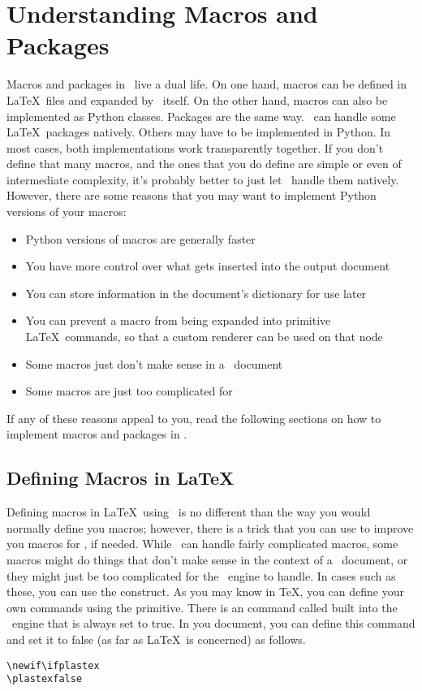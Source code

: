 
\chapter{Understanding Macros and Packages\label{sec:macros}}

Macros and packages in \plasTeX\ live a dual life.  On one hand, macros
can be defined in \LaTeX\ files and expanded by \plasTeX\ itself.  On
the other hand, macros can also be implemented as Python classes.
Packages are the same way.  \plasTeX\ can handle some \LaTeX\ packages
natively.  Others may have to be implemented in Python.  In most
cases, both implementations work transparently together.  If you don't
define that many macros, and the ones that you do define are simple
or even of intermediate complexity, it's probably better to just let
\plasTeX\ handle them natively. However, 
there are some reasons that you may want to implement Python versions
of your macros:
\begin{itemize}
\item Python versions of macros are generally faster
\item You have more control over what gets inserted into the output document
\item You can store information in the document's 
    dictionary for use later 
\item You can prevent a macro from being expanded into primitive \LaTeX\
    commands, so that a custom renderer can be used on that node
\item Some macros just don't make sense in a \plasTeX\ document
\item Some macros are just too complicated for \plasTeX
\end{itemize}

If any of these reasons appeal to you, read the following sections on
how to implement macros and packages in \plasTeX.


\section{Defining Macros in \LaTeX}

Defining macros in \LaTeX\ using \plasTeX\ is no different than the way
you would normally define you macros; however, there is a trick that you
can use to improve you macros for \plasTeX, if needed.  While \plasTeX\
can handle fairly complicated macros, some macros might do things that
don't make sense in the context of a \plasTeX\ document, or they might
just be too complicated for the \plasTeX\ engine to handle.  In
cases such as these, you can use the  construct.
As you may know in \TeX, you can define your own \macro{if} commands using
the \macro{newif} primitive.  There is an \macro{if} command called
\macro{ifplastex} built into the \plasTeX\ engine that is always set to
true.  In you document, you can define this command and set it to 
false (as far as \LaTeX\ is concerned) as follows.
\begin{verbatim}
\newif\ifplastex
\plastexfalse
\end{verbatim}

